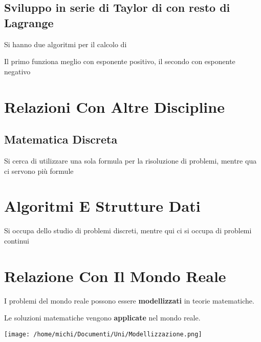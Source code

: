 \documentclass[
]{article}
\begin{document}
\hypertarget{sviluppo-in-serie-di-taylor-di-con-resto-di-lagrange}{%
\subsection{\texorpdfstring{Sviluppo in serie di Taylor di {} con resto
di
Lagrange}{Sviluppo in serie di Taylor di  con resto di Lagrange}}\label{sviluppo-in-serie-di-taylor-di-con-resto-di-lagrange}}

{}

Si hanno due algoritmi per il calcolo di {}\\
{}{}

Il primo funziona meglio con esponente positivo, il secondo con
esponente negativo

\hypertarget{relazioni-con-altre-discipline}{%
\section{Relazioni Con Altre
Discipline}\label{relazioni-con-altre-discipline}}

\hypertarget{matematica-discreta}{%
\subsection{Matematica Discreta}\label{matematica-discreta}}

Si cerca di utilizzare una sola formula per la risoluzione di problemi,
mentre qua ci servono più formule

\hypertarget{algoritmi-e-strutture-dati}{%
\section{Algoritmi E Strutture Dati}\label{algoritmi-e-strutture-dati}}

Si occupa dello studio di problemi discreti, mentre qui ci si occupa di
problemi continui

\hypertarget{relazione-con-il-mondo-reale}{%
\section{Relazione Con Il Mondo
Reale}\label{relazione-con-il-mondo-reale}}

I problemi del mondo reale possono essere \textbf{modellizzati} in
teorie matematiche.

Le soluzioni matematiche vengono \textbf{applicate} nel mondo reale.

\texttt{[image: /home/michi/Documenti/Uni/Modellizzazione.png]}
\end{document}
